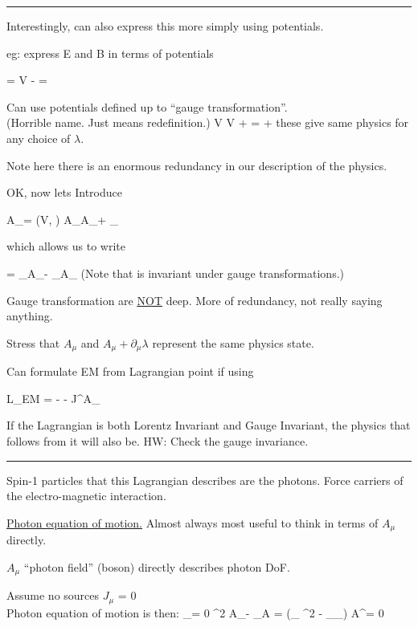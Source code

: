 {\noindent\rule{\textwidth}{1pt}

Interestingly, can also express this more simply using potentials.

eg: express E and B in terms of potentials

\be
{} = \vec{\nabla}V -  \hspace{1in}   = \vec{\nabla} \times {}
\ee


Can use potentials defined up to ``gauge transformation''.\\
(Horrible name. Just means redefinition.) 
\be
V \rightarrow V +  \hspace{1in}   =  + \vec{\nabla} \lambda
\ee
these give same physics for any choice of $\lambda$.

Note here there is an enormous redundancy in our description of the physics. 

OK, now lets Introduce

\be
A_\mu = (V, ) \hspace{1in} A_\mu \rightarrow A_\mu + \partial_\mu \lambda
\ee

which allows us to write 

\be
\fmn = \partial_\mu A_\nu - \partial_\nu A_\mu
\ee
(Note that \fmn is invariant under gauge transformations.)

Gauge transformation are \underline{\underline{NOT}} deep.  
More of redundancy, not really saying anything. 

Stress that $A_\mu$ and $A_\mu + \partial_\mu \lambda$ represent the same physics state. 

Can formulate EM from Lagrangian point if using 

\be
L_{EM} = - \fmn\fMN - J^\mu A_\mu
\ee

If the Lagrangian is both Lorentz Invariant and Gauge Invariant, the physics that follows from it will also be. 
HW: Check the gauge invariance.

\noindent\rule{\textwidth}{1pt}

Spin-1 particles that this Lagrangian describes are the photons.  
Force carriers of the electro-magnetic interaction. 

\underline{Photon equation of motion.}
Almost always most useful to think in terms of $A_\mu$ directly. 

$A_\mu$ ``photon field'' (boson) directly describes photon DoF.

Assume no sources $J_\mu$ = 0\\
Photon equation of motion is then:
\be
\partial_\mu \fMN  = 0  \Rightarrow  \partial^2 A_\mu - \partial_\mu \partial \cdot A = (\eta_{\mu\nu} \partial^2 - \partial_\mu  \partial_\nu ) A^\nu = 0
\ee


}
